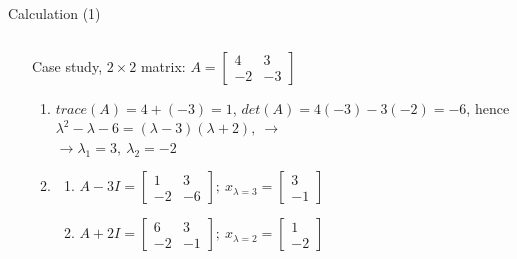 \documentclass[aspectratio=169]{beamer}
\begin{document}
\begin{frame}[t]{Calculation (1)}
\begin{columns}[T,onlytextwidth]
\begin{column}{0.49\textwidth}
        \end{column}
        \begin{column}{0.49\textwidth}
            Case study, $2\times 2$ matrix: $A= \begin{bmatrix}
            4 & 3\\ 
            -2 & -3 
            \end{bmatrix}$
        \begin{enumerate}
            \item $trace(A)= 4 + (-3)=1$, $det(A) = 4(-3) - 3(-2)=-6$, hence \\
            $\lambda^2 - \lambda - 6 = (\lambda-3)(\lambda+2),\ \rightarrow$ \\ $\rightarrow \lambda_1 = 3,\ \lambda_2=-2$
            \item 
            \begin{enumerate}
                \item $A-3I=\begin{bmatrix}
                1 & 3\\ 
                -2 & -6 
                \end{bmatrix};\  x_{\lambda=3} = \begin{bmatrix}
                3\\
                -1
                \end{bmatrix}$
                \item  $A+2I=\begin{bmatrix}
                    6 & 3\\ 
                    -2 & -1 
                    \end{bmatrix};\  x_{\lambda=2} = \begin{bmatrix}
                    1\\
                    -2
                    \end{bmatrix}$
            \end{enumerate}
        \end{enumerate}
        \end{column}
    \end{columns}
\end{frame}
\end{document}
